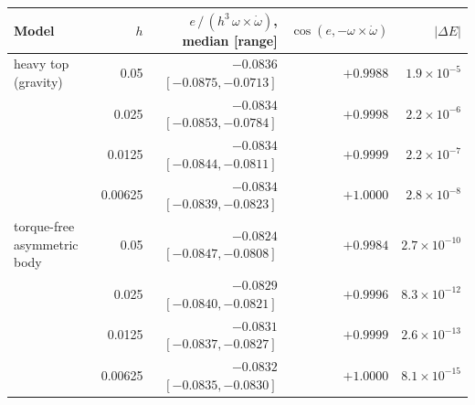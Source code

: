 \begin{tabular}{lrrrr}
\toprule
Model & $h$ & $e\,/\,(h^3\,\omega{\times}\dot\omega)$, median [range] & $\cos(e,-\omega{\times}\dot\omega)$ & $\lvert\Delta E\rvert$ \\
\midrule
heavy top (gravity) & 0.05 & $-0.0836$ $[-0.0875,-0.0713]$ & $+0.9988$ & $1.9\times10^{-5}$ \\
 & 0.025 & $-0.0834$ $[-0.0853,-0.0784]$ & $+0.9998$ & $2.2\times10^{-6}$ \\
 & 0.0125 & $-0.0834$ $[-0.0844,-0.0811]$ & $+0.9999$ & $2.2\times10^{-7}$ \\
 & 0.00625 & $-0.0834$ $[-0.0839,-0.0823]$ & $+1.0000$ & $2.8\times10^{-8}$ \\
\addlinespace
torque-free asymmetric body & 0.05 & $-0.0824$ $[-0.0847,-0.0808]$ & $+0.9984$ & $2.7\times10^{-10}$ \\
 & 0.025 & $-0.0829$ $[-0.0840,-0.0821]$ & $+0.9996$ & $8.3\times10^{-12}$ \\
 & 0.0125 & $-0.0831$ $[-0.0837,-0.0827]$ & $+0.9999$ & $2.6\times10^{-13}$ \\
 & 0.00625 & $-0.0832$ $[-0.0835,-0.0830]$ & $+1.0000$ & $8.1\times10^{-15}$ \\
\bottomrule
\end{tabular}
